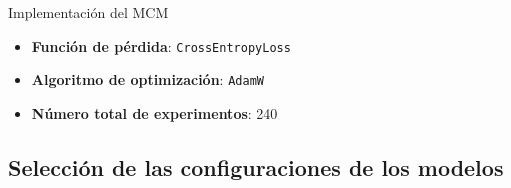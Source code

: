 \begin{frame}{Implementación del MCM}
	\begin{itemize}
		\item \textbf{Función de pérdida}: \texttt{CrossEntropyLoss}
		\item \textbf{Algoritmo de optimización}: \texttt{AdamW}
	\end{itemize}
	
	
	\begin{table}[H]
		\centering 
		\caption{Valores de los hiperparámetros utilizados en los experimentos del modelo de clasificación multiclase.}
		\label{tab:hiperBIN}
	\end{table}
	\begin{itemize}
		\item \textbf{Número total de experimentos}: 240
	\end{itemize}
\end{frame}



\subsection{Selección de las configuraciones de los modelos}

